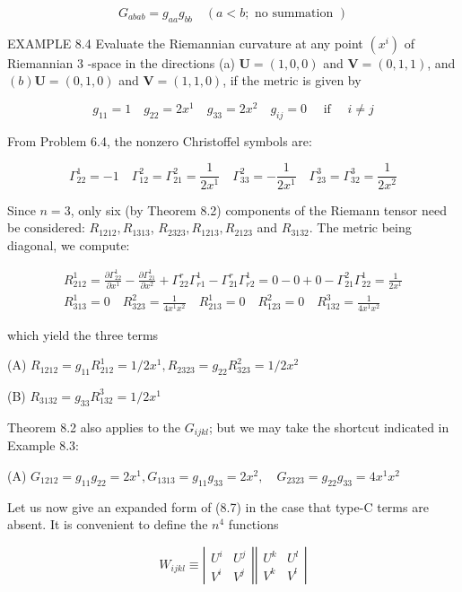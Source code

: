 \documentclass[10pt]{article}
\begin{document}
$$
G_{a b a b}=g_{a a} g_{b b} \quad(a<b ; \text { no summation })
$$

EXAMPLE 8.4 Evaluate the Riemannian curvature at any point $\left(x^{i}\right)$ of Riemannian 3 -space in the directions (a) $\mathbf{U}=(1,0,0)$ and $\mathbf{V}=(0,1,1)$, and $(b) \mathbf{U}=(0,1,0)$ and $\mathbf{V}=(1,1,0)$, if the metric is given by

$$
g_{11}=1 \quad g_{22}=2 x^{1} \quad g_{33}=2 x^{2} \quad g_{i j}=0 \quad \text { if } \quad i \neq j
$$

From Problem 6.4, the nonzero Christoffel symbols are:

$$
\Gamma_{22}^{1}=-1 \quad \Gamma_{12}^{2}=\Gamma_{21}^{2}=\frac{1}{2 x^{1}} \quad \Gamma_{33}^{2}=-\frac{1}{2 x^{1}} \quad \Gamma_{23}^{3}=\Gamma_{32}^{3}=\frac{1}{2 x^{2}}
$$

Since $n=3$, only six (by Theorem 8.2) components of the Riemann tensor need be considered: $R_{1212}, R_{1313}$, $R_{2323}, R_{1213}, R_{2123}$ and $R_{3132}$. The metric being diagonal, we compute:

$$
\begin{gathered}
R_{212}^{1}=\frac{\partial \Gamma_{22}^{1}}{\partial x^{1}}-\frac{\partial \Gamma_{21}^{1}}{\partial x^{2}}+\Gamma_{22}^{r} \Gamma_{r 1}^{1}-\Gamma_{21}^{r} \Gamma_{r 2}^{1}=0-0+0-\Gamma_{21}^{2} \Gamma_{22}^{1}=\frac{1}{2 x^{1}} \\
R_{313}^{1}=0 \quad R_{323}^{2}=\frac{1}{4 x^{1} x^{2}} \quad R_{213}^{1}=0 \quad R_{123}^{2}=0 \quad R_{132}^{3}=\frac{1}{4 x^{1} x^{2}}
\end{gathered}
$$

which yield the three terms

(A) $R_{1212}=g_{11} R_{212}^{1}=1 / 2 x^{1}, R_{2323}=g_{22} R_{323}^{2}=1 / 2 x^{2}$

(B) $R_{3132}=g_{33} R_{132}^{3}=1 / 2 x^{1}$

Theorem 8.2 also applies to the $G_{i j k l}$; but we may take the shortcut indicated in Example 8.3:

(A) $G_{1212}=g_{11} g_{22}=2 x^{1}, G_{1313}=g_{11} g_{33}=2 x^{2}, \quad G_{2323}=g_{22} g_{33}=4 x^{1} x^{2}$

Let us now give an expanded form of (8.7) in the case that type-C terms are absent. It is convenient to define the $n^{4}$ functions

\[
W_{i j k l} \equiv\left|\begin{array}{cc}
U^{i} & U^{j}  \tag{8.9}\\
V^{i} & V^{j}
\end{array}\right|\left|\begin{array}{ll}
U^{k} & U^{l} \\
V^{k} & V^{l}
\end{array}\right|
\]
\end{document}
